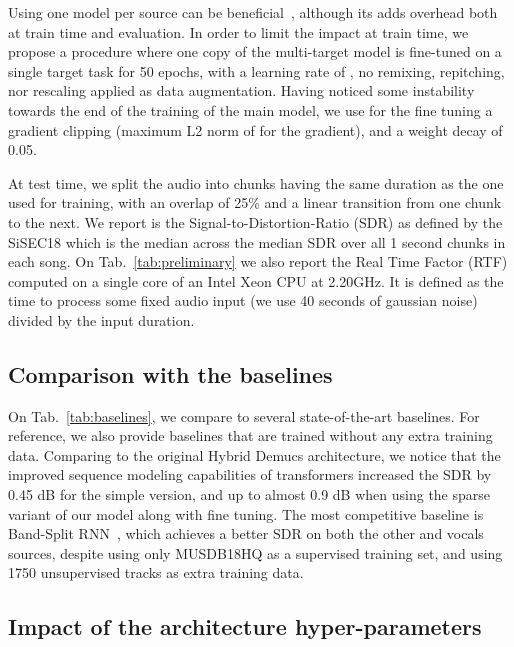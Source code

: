 \documentclass{article}
\begin{document}
Using one model per source can be beneficial~\cite{bsrnn}, although its adds overhead both at train time
and evaluation. In order to limit the impact at train time, we propose a  procedure
where one copy of the multi-target model is fine-tuned on a single target task for 50 epochs, with a learning rate of , no remixing, repitching, nor rescaling applied as data augmentation.
Having noticed some instability towards the end of the training of the main model, we use for the fine tuning a gradient clipping (maximum L2 norm of  for the gradient), and a weight decay of 0.05. 

At test time, we split the audio into chunks having the same duration as the one used for training, with an overlap of 25\% and a linear transition from one chunk to the next.
We report is the Signal-to-Distortion-Ratio (SDR) as defined by the SiSEC18 \cite{sisec18} which is the median across the median SDR over all 1 second chunks in each song. On Tab.~\ref{tab:preliminary} we also report the Real Time Factor (RTF)
computed on a single core of an Intel Xeon CPU at 2.20GHz. It is defined as the time to process some fixed audio input (we use 40 seconds of gaussian noise) divided by the input duration.

\subsection{Comparison with the baselines}

On Tab.~\ref{tab:baselines}, we compare to several state-of-the-art baselines. For reference, we also provide
baselines that are trained without any extra training data. Comparing to the original Hybrid Demucs architecture,
we notice that the improved sequence modeling capabilities of transformers increased the SDR by 0.45 dB for the simple version, and up to almost 0.9 dB when using the sparse variant of our model along with fine tuning.
The most competitive baseline is Band-Split RNN~\cite{bsrnn}, which achieves a better SDR on both the other and vocals sources, despite using only MUSDB18HQ as a supervised training set, and using 1750 unsupervised tracks as extra training data.



\subsection{Impact of the architecture hyper-parameters}
\label{sec:hyperparams}
\end{document}
